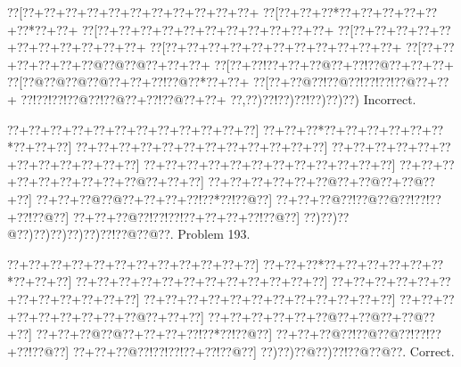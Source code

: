 \documentclass[a5paper]{article}
\begin{document}
\begin{center}
{\goo
\0??[\0??+\0??+\0??+\0??+\0??+\0??+\0??+\0??+\0??+\0??+\0??+
\0??[\0??+\0??+\0??*\0??+\0??+\0??+\0??+\0??+\0??*\0??+\0??+
\0??[\0??+\0??+\0??+\0??+\0??+\0??+\0??+\0??+\0??+\0??+\0??+
\0??[\0??+\0??+\0??+\0??+\0??+\0??+\0??+\0??+\0??+\0??+\0??+
\0??[\0??+\0??+\0??+\0??+\0??+\0??+\0??+\0??+\0??+\0??+\0??+
\0??[\0??+\0??+\0??+\0??+\0??+\0??@\0??@\0??@\0??+\0??+\0??+
\0??[\0??+\0??!\0??+\0??+\0??@\0??+\0??!\0??@\0??+\0??+\0??+
\0??[\0??@\0??@\0??@\0??@\0??+\0??+\0??!\0??@\0??*\0??+\0??+
\0??[\0??+\0??@\0??!\0??@\0??!\0??!\0??!\0??@\0??+\0??+
\0??!\0??!\0??!\0??@\0??!\0??@\0??+\0??!\0??@\0??+\0??+
\0??,\0??)\0??!\0??)\0??!\0??)\0??)\0??)
}
Incorrect. 

\end{center}
\newpage
\begin{center}
{\goo
\0??+\0??+\0??+\0??+\0??+\0??+\0??+\0??+\0??+\0??+\0??+\0??]
\0??+\0??+\0??*\0??+\0??+\0??+\0??+\0??+\0??*\0??+\0??+\0??]
\0??+\0??+\0??+\0??+\0??+\0??+\0??+\0??+\0??+\0??+\0??+\0??]
\0??+\0??+\0??+\0??+\0??+\0??+\0??+\0??+\0??+\0??+\0??+\0??]
\0??+\0??+\0??+\0??+\0??+\0??+\0??+\0??+\0??+\0??+\0??+\0??]
\0??+\0??+\0??+\0??+\0??+\0??+\0??+\0??+\0??@\0??+\0??+\0??]
\0??+\0??+\0??+\0??+\0??+\0??@\0??+\0??@\0??+\0??@\0??+\0??]
\0??+\0??+\0??@\0??@\0??+\0??+\0??+\0??!\0??*\0??!\0??@\0??]
\0??+\0??+\0??@\0??!\0??@\0??@\0??!\0??!\0??+\0??!\0??@\0??]
\0??+\0??+\0??@\0??!\0??!\0??!\0??+\0??+\0??+\0??!\0??@\0??]
\0??)\0??)\0??@\0??)\0??)\0??)\0??)\0??)\0??!\0??@\0??@\0??.
}
Problem 193.

\end{center}
\begin{center}
{\goo
\0??+\0??+\0??+\0??+\0??+\0??+\0??+\0??+\0??+\0??+\0??+\0??]
\0??+\0??+\0??*\0??+\0??+\0??+\0??+\0??+\0??*\0??+\0??+\0??]
\0??+\0??+\0??+\0??+\0??+\0??+\0??+\0??+\0??+\0??+\0??+\0??]
\0??+\0??+\0??+\0??+\0??+\0??+\0??+\0??+\0??+\0??+\0??+\0??]
\0??+\0??+\0??+\0??+\0??+\0??+\0??+\0??+\0??+\0??+\0??+\0??]
\0??+\0??+\0??+\0??+\0??+\0??+\0??+\0??+\0??@\0??+\0??+\0??]
\0??+\0??+\0??+\0??+\0??+\0??@\0??+\0??@\0??+\0??@\0??+\0??]
\0??+\0??+\0??@\0??@\0??+\0??+\0??+\0??!\0??*\0??!\0??@\0??]
\0??+\0??+\0??@\0??!\0??@\0??@\0??!\0??!\0??+\0??!\0??@\0??]
\0??+\0??+\0??@\0??!\0??!\0??!\0??+\0??!\0??@\0??]
\0??)\0??)\0??@\0??)\0??!\0??@\0??@\0??.
}
Correct. 

\end{center}
\end{document}
